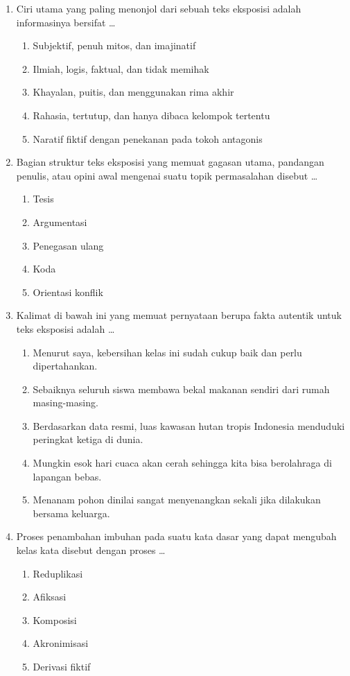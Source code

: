 \documentclass[12pt,a4paper]{article}
\begin{document}
\begin{enumerate}[leftmargin=*]
\item Ciri utama yang paling menonjol dari sebuah teks eksposisi adalah informasinya bersifat \dots
    \begin{enumerate}[label=\alph*.]
        \item Subjektif, penuh mitos, dan imajinatif
        \item Ilmiah, logis, faktual, dan tidak memihak
        \item Khayalan, puitis, dan menggunakan rima akhir
        \item Rahasia, tertutup, dan hanya dibaca kelompok tertentu
        \item Naratif fiktif dengan penekanan pada tokoh antagonis
    \end{enumerate}

\item Bagian struktur teks eksposisi yang memuat gagasan utama, pandangan penulis, atau opini awal mengenai suatu topik permasalahan disebut \dots
    \begin{enumerate}[label=\alph*.]
        \item Tesis
        \item Argumentasi
        \item Penegasan ulang
        \item Koda
        \item Orientasi konflik
    \end{enumerate}

\item Kalimat di bawah ini yang memuat pernyataan berupa fakta autentik untuk teks eksposisi adalah \dots
    \begin{enumerate}[label=\alph*.]
        \item Menurut saya, kebersihan kelas ini sudah cukup baik dan perlu dipertahankan.
        \item Sebaiknya seluruh siswa membawa bekal makanan sendiri dari rumah masing-masing.
        \item Berdasarkan data resmi, luas kawasan hutan tropis Indonesia menduduki peringkat ketiga di dunia.
        \item Mungkin esok hari cuaca akan cerah sehingga kita bisa berolahraga di lapangan bebas.
        \item Menanam pohon dinilai sangat menyenangkan sekali jika dilakukan bersama keluarga.
    \end{enumerate}

\item Proses penambahan imbuhan pada suatu kata dasar yang dapat mengubah kelas kata disebut dengan proses \dots
    \begin{enumerate}[label=\alph*.]
        \item Reduplikasi
        \item Afiksasi
        \item Komposisi
        \item Akronimisasi
        \item Derivasi fiktif
    \end{enumerate}


\end{enumerate}
\end{document}
